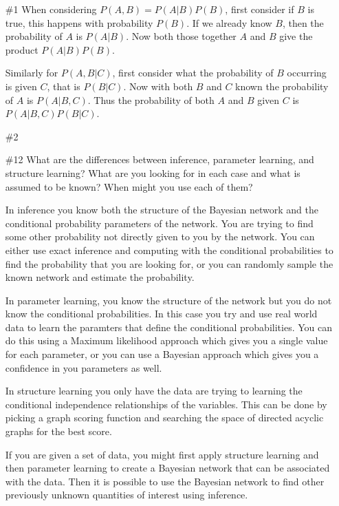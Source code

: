 \documentclass[11pt, oneside]{article}
\begin{document}
  \begin{enumerate}
    \item[\#1]
      When considering $P(A, B) = P(A | B)P(B)$, first consider if $B$ is true, this happens
      with probability $P(B)$.
      If we already know $B$, then the probability of $A$ is $P(A|B)$.
      Now both those together $A$ and $B$ give the product $P(A|B)P(B)$.

      Similarly for $P(A, B|C)$, first consider what the probability of $B$
      occurring is given $C$, that is $P(B|C)$.
      Now with both $B$ and $C$ known the probability of $A$ is $P(A|B,C)$.
      Thus the probability of both $A$ and $B$ given $C$ is $P(A|B,C)P(B|C)$.

    \item[\#2]

    \item[\#12]
      What are the differences between inference, parameter learning, and
      structure learning?
      What are you looking for in each case and what is assumed to be known?
      When might you use each of them?

      In inference you know both the structure of the Bayesian network and the
      conditional probability parameters of the network.
      You are trying to find some other probability not directly given to you
      by the network.
      You can either use exact inference and computing with the conditional
      probabilities to find the probability that you are looking for, or you
      can randomly sample the known network and estimate the probability.

      In parameter learning, you know the structure of the network but you
      do not know the conditional probabilities.
      In this case you try and use real world data to learn the paramters that
      define the conditional probabilities.
      You can do this using a Maximum likelihood approach which gives you a
      single value for each parameter, or you can use a Bayesian approach which
      gives you a confidence in you parameters as well.

      In structure learning you only have the data are trying to learning the
      conditional independence relationships of the variables.
      This can be done by picking a graph scoring function and searching the
      space of directed acyclic graphs for the best score.

      If you are given a set of data, you might first apply structure learning and
      then parameter learning to create a Bayesian network that can be associated with
      the data.
      Then it is possible to use the Bayesian network to find other previously
      unknown quantities of interest using inference.
  \end{enumerate}
\end{document}

